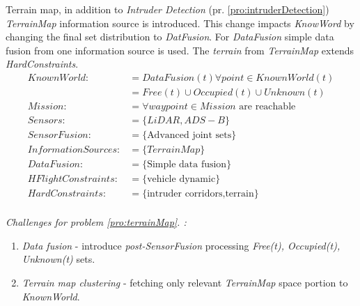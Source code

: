 \begin{problem}{Terrain map}\label{pro:terrainMap},
    in addition to \emph{Intruder Detection} (pr. \ref{pro:intruderDetection}) \emph{TerrainMap} information source is introduced. This change impacts \emph{KnowWord} by changing the final set distribution to \emph{DatFusion}. For \emph{DataFusion} simple data fusion from one information source is used. The \emph{terrain} from \emph{TerrainMap} extends \emph{HardConstraints}. 
    \begin{equation}\label{eq:terainMapProblemDefinition}
        \begin{aligned}
            KnownWorld:&= DataFusion(t)\forall point\in KnownWorld(t)\\
                       &=Free(t) \cup Occupied(t) \cup Unknown(t)\\
            Mission:&= \forall waypoint\in Mission \text{ are reachable}\\
            Sensors:&= \{LiDAR,ADS-B\}\\
            SensorFusion:&= \{\text{Advanced joint sets}\}\\
            InformationSources:&=\{Terrain Map\}\\
            DataFusion:&= \{\text{Simple data fusion}\}\\
            HFlightConstraints:&=\{\text{vehicle dynamic}\}\\
            HardConstraints:&=\{\text{intruder corridors,terrain}\}\\
        \end{aligned}
    \end{equation}
    
    \ifproblemchallenge
    \noindent \emph{Challenges for problem  \ref{pro:terrainMap}. :}
    \begin{enumerate}
        \item \emph{Data fusion} - introduce \emph{post-SensorFusion} processing \emph{Free(t), Occupied(t),  Unknown(t)} sets.
        \item \emph{Terrain map clustering} - fetching only relevant \emph{TerrainMap} space portion to \emph{KnownWorld}.
    \end{enumerate}
    \fi
\end{problem}


